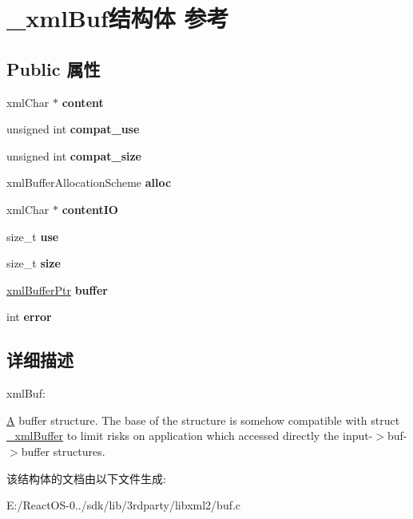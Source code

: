 \hypertarget{struct__xml_buf}{}\section{\+\_\+xml\+Buf结构体 参考}
\label{struct__xml_buf}
\subsection*{Public 属性}
\begin{DoxyCompactItemize}
\item 
\mbox{\label{struct__xml_buf_a36bd461f600181b01cd88dc9b5e9442d}} 
xml\+Char $\ast$ {\bfseries content}
\item 
\mbox{\label{struct__xml_buf_a4294de4df30dbd385adf0354a259bfd6}} 
unsigned int {\bfseries compat\+\_\+use}
\item 
\mbox{\label{struct__xml_buf_a45ac107ee8bb7adf2fbb142770554882}} 
unsigned int {\bfseries compat\+\_\+size}
\item 
\mbox{\label{struct__xml_buf_a99f975866b782a369e8f9272728d23ff}} 
xml\+Buffer\+Allocation\+Scheme {\bfseries alloc}
\item 
\mbox{\label{struct__xml_buf_a33ea56c64fdc1e1a52eb0d3e29f3419c}} 
xml\+Char $\ast$ {\bfseries content\+IO}
\item 
\mbox{\label{struct__xml_buf_a5da255cf66f594cece24bcbcd8c268e8}} 
size\+\_\+t {\bfseries use}
\item 
\mbox{\label{struct__xml_buf_aba5d1528b1edeac13361f54ab1ab29c8}} 
size\+\_\+t {\bfseries size}
\item 
\mbox{\label{struct__xml_buf_a6d91d28c70d175611501657cb6dd53d3}} 
\hyperlink{struct__xml_buffer}{xml\+Buffer\+Ptr} {\bfseries buffer}
\item 
\mbox{\label{struct__xml_buf_adf1be3b3a67fce1eda7e347a2d6322b1}} 
int {\bfseries error}
\end{DoxyCompactItemize}


\subsection{详细描述}
xml\+Buf\+:

\hyperlink{struct_a}{A} buffer structure. The base of the structure is somehow compatible with struct \hyperlink{struct__xml_buffer}{\+\_\+xml\+Buffer} to limit risks on application which accessed directly the input-\/$>$buf-\/$>$buffer structures. 

该结构体的文档由以下文件生成\+:\begin{DoxyCompactItemize}
\item 
E\+:/\+React\+O\+S-\/0../sdk/lib/3rdparty/libxml2/buf.\+c\end{DoxyCompactItemize}
